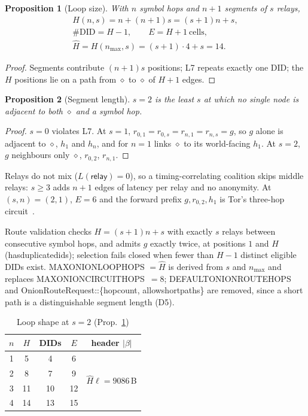 \documentclass[journal]{IEEEtran}
\newtheorem{proposition}{Proposition}
\newcommand{\relay}{\mathsf{relay}}
\newcommand{\cl}{\diamond}
\newcommand{\Hm}{\hat H}
\DeclareRobustCommand{\code}[1]{{\ttfamily\renewcommand{\_}{\textunderscore\allowbreak}#1}}
\begin{document}
\begin{proposition}[Loop size]\label{prop:size}
With $n$ symbol hops and $n+1$ segments of $s$ relays,
\begin{gather*}
H(n,s)=n+(n+1)s=(s+1)n+s,\\
\#\mathrm{DID}=H-1,\qquad E=H+1\ \text{cells},\\
\Hm=H(n_{\max},s)=(s+1)\cdot4+s=14 .
\end{gather*}
\end{proposition}
\begin{proof}
Segments contribute $(n+1)s$ positions; L7 repeats exactly one DID; the
$H$ positions lie on a path from $\cl$ to $\cl$ of $H+1$ edges.
\end{proof}

\begin{proposition}[Segment length]\label{prop:s}
$s=2$ is the least $s$ at which no single node is adjacent to both $\cl$
and a symbol hop.
\end{proposition}
\begin{proof}
$s=0$ violates L7.  At $s=1$, $r_{0,1}=r_{0,s}=r_{n,1}=r_{n,s}=g$, so $g$
alone is adjacent to $\cl$, $h_1$ and $h_n$, and for $n=1$ links $\cl$ to
its world-facing $h_1$.  At $s=2$, $g$ neighbours only $\cl$, $r_{0,2}$,
$r_{n,1}$.
\end{proof}

Relays do not mix ($L(\relay)=0$), so a timing-correlating coalition skips
middle relays: $s\ge3$ adds $n+1$ edges of latency per relay and no
anonymity.  At $(s,n)=(2,1)$, $E=6$ and the forward prefix
$g,r_{0,2},h_1$ is Tor's three-hop circuit~\cite{Dingledine2004}.

Route validation checks $H=(s+1)n+s$ with exactly $s$ relays between
consecutive symbol hops, and admits $g$ exactly twice, at positions $1$
and $H$ (\code{has\_duplicate\_dids}); selection fails closed when fewer
than $H-1$ distinct eligible DIDs exist.  \code{MAX\_ONION\_LOOP\_HOPS}
$=\Hm$ is derived from $s$ and $n_{\max}$ and replaces
\code{MAX\_ONION\_CIRCUIT\_HOPS}~$=8$; \code{DEFAULT\_ONION\_ROUTE\_HOPS}
and \code{OnionRouteRequest::\{hop\_count, allow\_short\_paths\}} are
removed, since a short path is a distinguishable segment length (D5).

\begin{table}[t]
\caption{Loop shape at $s=2$ (Prop.~\ref{prop:size})}
\label{tab:size}
\centering\small
\begin{tabular}{@{}ccccc@{}}
\toprule
$n$ & $H$ & DIDs & $E$ & header $|\beta|$ \\
\midrule
1 & 5 & 4 & 6 & \multirow{4}{*}{$\Hm\ell=9086$\,B} \\
2 & 8 & 7 & 9 & \\
3 & 11 & 10 & 12 & \\
4 & 14 & 13 & 15 & \\
\bottomrule
\end{tabular}
\end{table}
\end{document}
